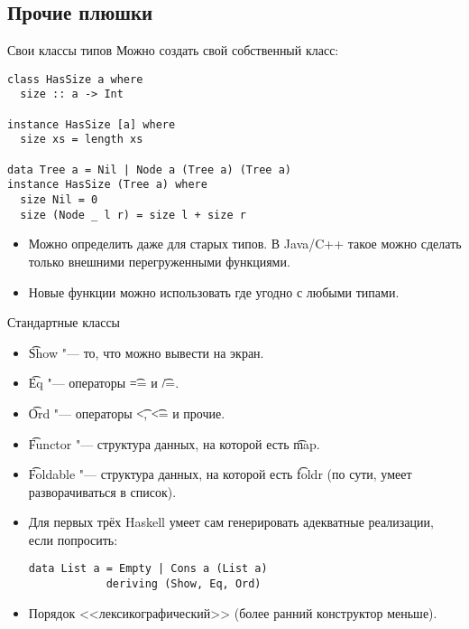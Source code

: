 \subsection{Прочие плюшки}
\begin{frame}[fragile]{Свои классы типов}
	Можно создать свой собственный класс:
\begin{verbatim}
class HasSize a where
  size :: a -> Int

instance HasSize [a] where
  size xs = length xs

data Tree a = Nil | Node a (Tree a) (Tree a)
instance HasSize (Tree a) where
  size Nil = 0
  size (Node _ l r) = size l + size r
\end{verbatim}
	\begin{itemize}
		\item
			Можно определить даже для старых типов.
			В Java/C++ такое можно сделать только внешними перегруженными функциями.
		\item Новые функции можно использовать где угодно с любыми типами.
	\end{itemize}
\end{frame}

\begin{frame}[fragile]{Стандартные классы}
	\begin{itemize}
		\item \t{Show} "--- то, что можно вывести на экран.
		\item \t{Eq} "--- операторы \t{==} и \t{/=}.
		\item \t{Ord} "--- операторы \t{<}, \t{<=} и прочие.
		\item \t{Functor} "--- структура данных, на которой есть \t{map}.
		\item \t{Foldable} "--- структура данных, на которой есть \t{foldr} (по сути, умеет разворачиваться в список).
		\item Для первых трёх Haskell умеет сам генерировать адекватные реализации, если попросить:
\begin{verbatim}
data List a = Empty | Cons a (List a)
            deriving (Show, Eq, Ord)
\end{verbatim}
		\item Порядок <<лексикографический>> (более ранний конструктор меньше).
	\end{itemize}
\end{frame}

